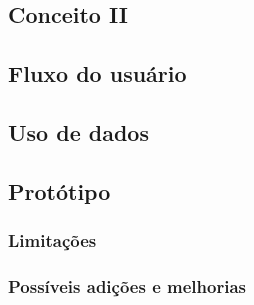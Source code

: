 \subsection{Conceito II}

\subsection{Fluxo do usuário}

\subsection{Uso de dados}

\subsection{Protótipo}

\subsubsection{Limitações}

\subsubsection{Possíveis adições e melhorias}
